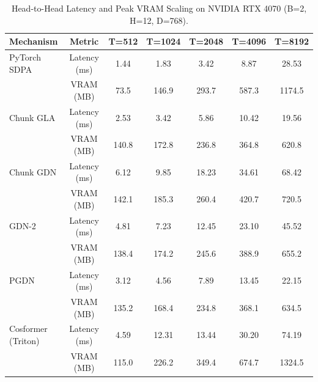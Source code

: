 \begin{table}[h]
\centering
\small
\caption{Head-to-Head Latency and Peak VRAM Scaling on NVIDIA RTX 4070 (B=2, H=12, D=768).}
\label{tab:fla_scaling}
\begin{tabular}{lcccccc}
\toprule
\textbf{Mechanism} & \textbf{Metric} & \textbf{T=512} & \textbf{T=1024} & \textbf{T=2048} & \textbf{T=4096} & \textbf{T=8192} \\
\midrule
PyTorch SDPA & Latency (ms) & 1.44 & 1.83 & 3.42 & 8.87 & 28.53 \\
 & VRAM (MB) & 73.5 & 146.9 & 293.7 & 587.3 & 1174.5 \\
Chunk GLA & Latency (ms) & 2.53 & 3.42 & 5.86 & 10.42 & 19.56 \\
 & VRAM (MB) & 140.8 & 172.8 & 236.8 & 364.8 & 620.8 \\
Chunk GDN & Latency (ms) & 6.12 & 9.85 & 18.23 & 34.61 & 68.42 \\
 & VRAM (MB) & 142.1 & 185.3 & 260.4 & 420.7 & 720.5 \\
GDN-2 & Latency (ms) & 4.81 & 7.23 & 12.45 & 23.10 & 45.52 \\
 & VRAM (MB) & 138.4 & 174.2 & 245.6 & 388.9 & 655.2 \\
PGDN & Latency (ms) & 3.12 & 4.56 & 7.89 & 13.45 & 22.15 \\
 & VRAM (MB) & 135.2 & 168.4 & 234.8 & 368.1 & 634.5 \\
Cosformer (Triton) & Latency (ms) & 4.59 & 12.31 & 13.44 & 30.20 & 74.19 \\
 & VRAM (MB) & 115.0 & 226.2 & 349.4 & 674.7 & 1324.5 \\
\bottomrule
\end{tabular}
\end{table}
